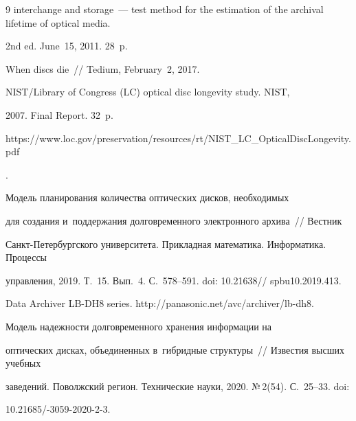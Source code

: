 {{\begin{thebibliography}{9}
interchange and storage~--- test method for the estimation of the archival lifetime of optical media. 


2nd ed. June~15, 2011. 28~p.







   When discs die~/\!\!/ Tedium, February~2, 2017.


  




   NIST\!/\!Library of Congress (LC) optical disc longevity study. NIST,


2007.  Final Report. 32~p. {\sf 


https://www.loc.gov/preservation/resources/\linebreak rt/NIST\_LC\_OpticalDiscLongevity.pdf}.




   Модель планирования количества оптических дисков, необходимых 


для создания и~поддержания долговременного электронного архива~/\!\!/ Вестник  


Санкт-Пе\-тер\-бург\-ско\-го университета. Прикладная математика. Информатика. Процессы 


управления, 2019. Т.~15. Вып.~4. С.~578--591. doi: 10.21638\!/\!/ \mbox{spbu10}.2019.413.




  Data Archiver LB-DH8 series. {\sf http://panasonic.net/avc/archiver/lb-dh8}.




   Модель надежности долговременного хранения информации на 


оптических дисках, объединенных в~гибридные структуры~/\!\!/ Известия высших учебных 


заведений. Поволжский регион. Технические науки, 2020. №\,2(54). С.~25--33. doi: 


10.21685\!/-3059-2020-2-3.


       \end{thebibliography}


} }











